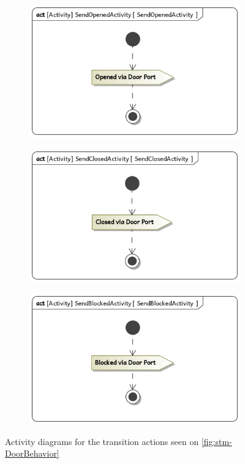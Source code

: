 \documentclass[a4paper]{article}
\begin{document}
\begin{figure}
	\begin{subfigure}{.33\textwidth}
		\includegraphics[width=\textwidth]
		{stm-DoorBehavior-SendOpenedActivity.jpg}
	\end{subfigure}
	\begin{subfigure}{.33\textwidth}
		\includegraphics[width=\textwidth]
		{stm-DoorBehavior-SendClosedActivity.jpg}
	\end{subfigure}
	\begin{subfigure}{.33\textwidth}
		\includegraphics[width=\textwidth]
		{stm-DoorBehavior-SendBlockedActivity.jpg}
	\end{subfigure}
	\caption{Activity diagrams for the transition actions seen on
		\cref{fig:stm-DoorBehavior}}%
	\label{fig:stm-DoorBehavior-actions}
\end{figure}
\end{document}

